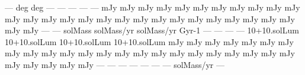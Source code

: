 ---
deg
deg
---
---
---
---
---
mJy
mJy
mJy
mJy
mJy
mJy
mJy
mJy
mJy
mJy
mJy
mJy
mJy
mJy
mJy
mJy
mJy
mJy
mJy
mJy
mJy
mJy
mJy
mJy
mJy
mJy
mJy
mJy
mJy
---
---
solMass
solMass/yr
solMass/yr
Gyr-1
---
---
---
---
10+10.solLum
10+10.solLum
10+10.solLum
10+10.solLum
mJy
mJy
mJy
mJy
mJy
mJy
mJy
mJy
mJy
mJy
mJy
mJy
mJy
mJy
mJy
mJy
mJy
mJy
mJy
mJy
mJy
mJy
mJy
mJy
mJy
mJy
mJy
mJy
---
---
---
---
---
---
---
solMass/yr
---